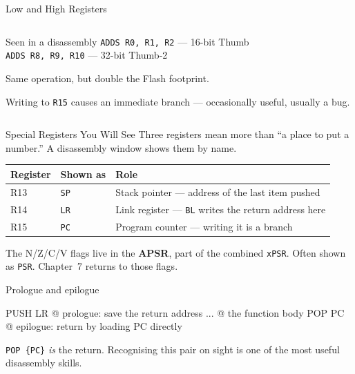 \documentclass[9pt,aspectratio=169,xcolor=table]{beamer}
\begin{document}
\begin{frame}[plain]{Low and High Registers}
\begin{columns}[c]
\begin{column}{.5\textwidth}
        \vspace{3mm}
        \begin{block}{Seen in a disassembly}
            {\small \texttt{ADDS R0, R1, R2} --- 16-bit Thumb\\
            \texttt{ADDS R8, R9, R10} --- 32-bit Thumb-2}

            \vspace{1mm}
            {\small Same operation, but \alert{double} the Flash footprint.}
        \end{block}

        \vspace{3mm}
        {\small Writing to \texttt{R15} causes an immediate branch ---
        occasionally useful, usually a bug.}
    \end{column}
    \end{columns}
\end{frame}

\begin{frame}[fragile]{Special Registers You Will See}
    \leavevmode
    {\small Three registers mean more than ``a place to put a number.''
    A disassembly window shows them by name.}

    \vspace{2mm}
    \begin{center}
    {\small
    \striped
    \begin{tabular}{@{}l l R{.5\textwidth}@{}}
        \toprule
        \textbf{Register} & \textbf{Shown as} & \textbf{Role} \\
        \midrule
        R13 & \texttt{SP} & Stack pointer --- address of the last item pushed \\
        R14 & \texttt{LR} & Link register --- \texttt{BL} writes the return address here \\
        R15 & \texttt{PC} & Program counter --- writing it is a branch \\
        \bottomrule
    \end{tabular}}
    \end{center}

    \vspace{2mm}
    {\small The N/Z/C/V flags live in the \textbf{APSR}, part of the
    combined \texttt{xPSR}. Often shown as \texttt{PSR}. Chapter~7 returns
    to those flags.}

    \vspace{2mm}
    \begin{block}{Prologue and epilogue}
        \begin{asm}[basicstyle=\normalsize\ttfamily]
PUSH  {LR}    @ prologue: save the return address
...           @ the function body
POP   {PC}    @ epilogue: return by loading PC directly
\end{asm}

        {\footnotesize \texttt{POP \{PC\}} \emph{is} the return. Recognising
        this pair on sight is one of the most useful disassembly skills.}
    \end{block}
\end{frame}
\end{document}
